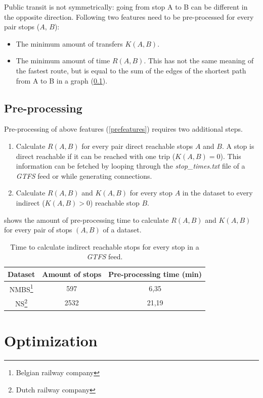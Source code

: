 \documentclass[twocolumn]{phdsymp} %
\begin{document}
Public transit is not symmetrically: going from stop A to B can be different in the opposite direction. Following two features need to be pre-processed for every pair stops ($A$, $B$):
\begin{itemize}
\label{prefeatures}
\item The minimum amount of transfers $K(A, B)$.
\item The minimum amount of time $R(A, B)$. This has not the same meaning of the fastest route, but is equal to the sum of the edges of the shortest path from A to B in a graph (\cref{pre-processing}).
\end{itemize}

\subsection{Pre-processing}
\label{pre-processing}

Pre-processing of above features (\cref{prefeatures}) requires two additional steps.
\begin{enumerate}
\item Calculate $R(A,B)$ for every pair direct reachable stops $A$ and $B$. A stop is direct reachable if it can be reached with one trip ($K(A,B) = 0$). This information can be fetched by looping through the \textit{stop\_times.txt} file of a \textit{GTFS} feed or while generating connections.
\item Calculate $R(A,B)$ and $K(A,B)$ for every stop $A$ in the dataset to every indirect ($K(A,B)>0$) reachable stop $B$.
\end{enumerate}

 shows the amount of pre-processing time to calculate $R(A,B)$ and $K(A,B)$ for every pair of stops $(A,B)$ of a dataset.
\begin{table}[htbp]
\centering
\begin{tabular}{ | c || c | c | }
  \hline
  Dataset & Amount of stops & Pre-processing time (min) \\ \hline
  NMBS\footnote{Belgian railway company} & 597 & 6,35 \\
  NS\footnote{Dutch railway company} & 2532 & 21,19 \\
\hline  
\end{tabular}
\caption{Time to calculate indirect reachable stops for every stop in a \textit{GTFS} feed.}
\label{table:calcneighbours}
\end{table}

\section{Optimization}
\label{optimization}
\end{document}
